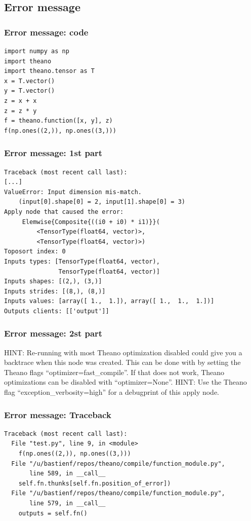 \documentclass[utf8x,xcolor=pdftex,dvipsnames,table]{beamer}
\begin{document}
\subsection{Error message}
\begin{frame}[fragile]
  \frametitle{Error message: code}
\begin{lstlisting}
import numpy as np
import theano
import theano.tensor as T
x = T.vector()
y = T.vector()
z = x + x
z = z * y
f = theano.function([x, y], z)
f(np.ones((2,)), np.ones((3,)))
\end{lstlisting}
\end{frame}

\begin{frame}[fragile]
  \frametitle{Error message: 1st part}

\begin{lstlisting}
Traceback (most recent call last):
[...]
ValueError: Input dimension mis-match.
    (input[0].shape[0] = 2, input[1].shape[0] = 3)
Apply node that caused the error:
     Elemwise{Composite{((i0 + i0) * i1)}}(
         <TensorType(float64, vector)>,
         <TensorType(float64, vector)>)
Toposort index: 0
Inputs types: [TensorType(float64, vector),
               TensorType(float64, vector)]
Inputs shapes: [(2,), (3,)]
Inputs strides: [(8,), (8,)]
Inputs values: [array([ 1.,  1.]), array([ 1.,  1.,  1.])]
Outputs clients: [['output']]
\end{lstlisting}
\end{frame}

\begin{frame}[fragile]
  \frametitle{Error message: 2st part}
HINT: Re-running with most Theano optimization
disabled could give you a backtrace when this
node was created. This can be done with by setting
the Theano flags ``optimizer=fast\_compile''. If that does not
work, Theano optimizations can be disabled with
``optimizer=None''.\newline
HINT: Use the Theano flag ``exception\_verbosity=high''
for a debugprint of this apply node.
\end{frame}


\begin{frame}[fragile]
  \frametitle{Error message: Traceback}

\begin{lstlisting}
Traceback (most recent call last):
  File "test.py", line 9, in <module>
    f(np.ones((2,)), np.ones((3,)))
  File "/u/bastienf/repos/theano/compile/function_module.py",
       line 589, in __call__
    self.fn.thunks[self.fn.position_of_error])
  File "/u/bastienf/repos/theano/compile/function_module.py",
       line 579, in __call__
    outputs = self.fn()
\end{lstlisting}
\end{frame}
\end{document}
